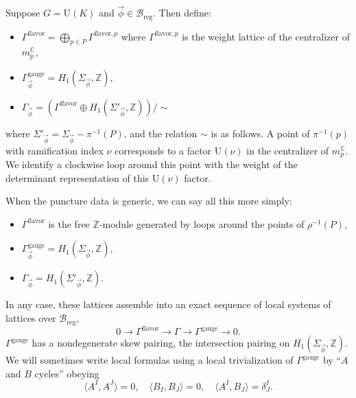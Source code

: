 \documentclass[12pt,letterpaper,reqno]{article}
\numberwithin{equation}{section}
\newcommand{\cB}{\ensuremath{\mathcal B}}
\newcommand{\C}{\ensuremath{\mathbb C}}
\newcommand{\Z}{\ensuremath{\mathbb Z}}
\newcommand{\reg}{\mathrm{reg}}
\newcommand{\gauge}{\mathrm{gauge}}
\newcommand{\flavor}{\mathrm{flavor}}
\newcommand{\IP}[1]{\langle#1\rangle}
\newcommand{\vphi}{{\vec\phi}}
\newcommand{\U}{\mathrm{U}}
\newcommand{\fixme}[1]{{\color{orange}{[#1]}}}
\begin{document}
\begin{defn}[Charge lattices for $G = \U(K)$]
Suppose $G = \U(K)$ and $\vphi \in \cB_\reg$. 
Then define:
\begin{itemize}
 \item $\Gamma^\flavor = \bigoplus_{p \in P} \Gamma^{\flavor,p}$ where $\Gamma^{\flavor,p}$
 is the weight lattice of the centralizer of $m^\C_p$,
 \item $\Gamma_\vphi^\gauge = H_1(\Sigma_\vphi, \Z)$,
 \item $\Gamma_\vphi = \left( \Gamma^\flavor \oplus H_1(\Sigma'_\vphi,\Z) \right) / \sim$
\end{itemize}
where $\Sigma'_\vphi = \Sigma_\vphi - \pi^{-1}(P)$,
and the relation $\sim$ is as follows. A point of $\pi^{-1}(p)$ with ramification index $\nu$ corresponds to a factor $\U(\nu)$ in the centralizer of $m_p^\C$. We identify a clockwise 
loop around this point with the weight of the 
determinant representation of this $\U(\nu)$ factor.
\end{defn}

\begin{example}[Charge lattices for $G = \U(K)$ with generic puncture data]
When the puncture data is generic, we can say all this
more simply:
\begin{itemize}
 \item $\Gamma^\flavor$ is the free $\Z$-module generated
by loops around the points of $\rho^{-1}(P)$,
 \item $\Gamma_\vphi^\gauge = H_1(\Sigma_\vphi, \Z)$,
 \item $\Gamma_\vphi = H_1(\Sigma'_\vphi, \Z)$.
\end{itemize}
\end{example}

\fixme{discuss $SU(K)$ case}

In any case, these lattices assemble into an exact 
sequence of local systems of lattices over $\cB_\reg$,
\begin{equation} \label{eq:lattice-extension}
0 \to \Gamma^\flavor \to \Gamma \to \Gamma^\gauge \to 0.
\end{equation}
$\Gamma^\gauge$ has a nondegenerate skew pairing,
the intersection pairing on $H_1(\Sigma_\vphi, \Z)$.
We will sometimes write local formulas using a local
trivialization of $\Gamma^\gauge$ by ``$A$ and $B$ cycles''
obeying
\begin{equation}
  \IP{A^I, A^J}=0, \quad \IP{B_I, B_J}=0, \quad \IP{A^I,B_J} = \delta^I_J.
\end{equation}
\end{document}
